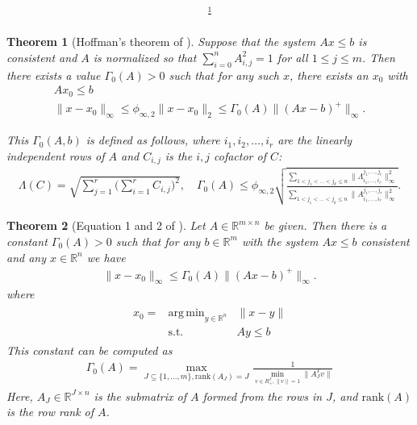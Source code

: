 \documentclass{article}
\newtheorem{theorem}{Theorem}[section]
\theoremstyle{case}
\numberwithin{theorem}{subsection}
\DeclareMathOperator*{\argmin}{arg\,min}
\newcommand{\huff}{{\Gamma_0}}
\newcommand{\Rm}{\mathbb R^m}
\newcommand{\Rn}{\mathbb R^n}
\begin{document}
\begin{align*}
\frac 1 {}
\end{align*}
\color{black}



\color{red}
\begin{theorem}[Hoffman's theorem of \cite{hoffman_theorem}]
\label{hoffman_old}
Suppose that the system $Ax \le b$ is consistent and $A$ is normalized so that $\sum_{i = 0}^n{A}_{i,j}^2 = 1$ for all $1 \le j \le m$.
Then there exists a value $\huff(A) > 0$ such that for any such $x$, there exists an $x_0$ with
\begin{align*}
Ax_0 \le b \\
\|x - x_0\|_{\infty} \le \phi_{\infty, 2}\|x - x_0\|_2 \le {\huff(A)} \|(Ax - b)^+\|_\infty.
\end{align*}

This $\huff(A,b)$ is defined as follows, where $i_1, i_2, \ldots, i_r$ are the linearly independent rows of $A$ and $C_{i,j}$ is the $i,j$ cofactor of $C$:
\begin{align*}
\Lambda(C) = \sqrt{\sum_{j=1}^r\bigg(\sum_{i=1}^r C_{i,j}\bigg)^2}, \quad
{\huff(A)} \le \phi_{\infty, 2}\sqrt{\frac{\sum_{1 < j_1 < \ldots < j_k \le n} \|\Lambda^{j_1,\ldots,j_r}_{i_1,\ldots, i_r}\|_{\infty}^2}{\sum_{1 < j_1 < \ldots < j_k \le n} \|A^{j_1,\ldots,j_r}_{i_1,\ldots, i_r}\|_{\infty}^2}}.
\end{align*}
\end{theorem}



\begin{theorem}[Equation 1 and 2 of \cite{pena2018algorithm}]
\label{hoffman}
Let $A \in \mathbb R^{m \times n}$ be given.
Then there is a constant $\huff(A) > 0$ such that for any $b \in \Rm$ with the system $Ax \le b$ consistent and any $x \in \Rn$ we have
\begin{align*}
\|x - x_0\|_{\infty} \le \huff(A) \|(Ax - b)^+\|_\infty.
\end{align*}
where
\begin{align*}
\begin{array}{ccc}
x_0 = & \argmin_{y \in \Rn} & \|x - y\| \\
      & \textrm{s.t.}    & Ay \le b
\end{array}
\end{align*}
This constant can be computed as
\begin{align*}
\huff(A) = \max_{J \subseteq \{1,\ldots,m\}, \textrm{rank}(A_J) = J} \frac 1 {\min_{v \in R^J_{+}, \|v\| = 1} \|A_J^Tv\|}
\end{align*}
Here, $A_J \in \mathbb R^{J \times n}$ is the submatrix of $A$ formed from the rows in $J$, and $\textrm{rank}(A)$ is the row rank of $A$.
\end{theorem}
\end{document}
